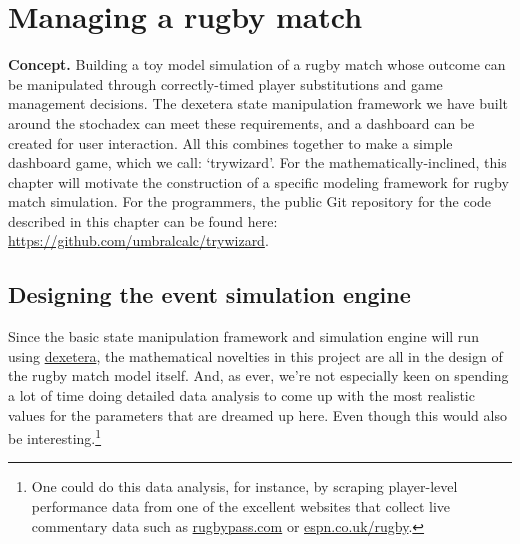 \chapter{\sffamily Managing a rugby match}

{\bfseries\sffamily Concept.} Building a toy model simulation of a rugby match whose outcome can be manipulated through correctly-timed player substitutions and game management decisions. The dexetera state manipulation framework we have built around the stochadex can meet these requirements, and a dashboard can be created for user interaction. All this combines together to make a simple dashboard game, which we call: `trywizard'. For the mathematically-inclined, this chapter will motivate the construction of a specific modeling framework for rugby match simulation. For the programmers, the public Git repository for the code described in this chapter can be found here: \href{https://github.com/umbralcalc/trywizard}{https://github.com/umbralcalc/trywizard}.

\section{\sffamily Designing the event simulation engine}

Since the basic state manipulation framework and simulation engine will run using \href{https://github.com/umbralcalc/dexetera}{dexetera}, the mathematical novelties in this project are all in the design of the rugby match model itself. And, as ever, we're not especially keen on spending a lot of time doing detailed data analysis to come up with the most realistic values for the parameters that are dreamed up here. Even though this would also be interesting.\footnote{One could do this data analysis, for instance, by scraping player-level performance data from one of the excellent websites that collect live commentary data such as \href{https://www.rugbypass.com/}{rugbypass.com} or \href{https://www.espn.co.uk/rugby/}{espn.co.uk/rugby}.}

